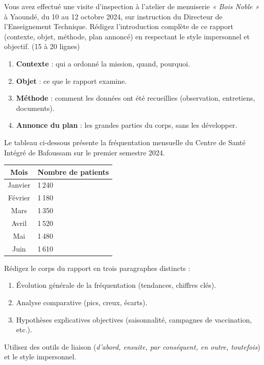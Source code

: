 \documentclass[11pt]{article}
\newcounter{popsec}
\newcounter{popsub}
\newcommand{\courssub}[1]{%
  \stepcounter{popsub}%
  \par\vspace{9pt}\noindent{\popxbold\fontsize{11.5}{13}\selectfont\color{popink}{\color{poporange}\thepopsec.\thepopsub}\hspace{6pt}#1}\par\nopagebreak\vspace{4pt}
}
\begin{document}
\courssub{Je m'entraîne}

\begin{exercice}
Vous avez effectué une visite d'inspection à l'atelier de menuiserie \emph{« Bois Noble »} à Yaoundé, du 10 au 12 octobre 2024, sur instruction du Directeur de l'Enseignement Technique. Rédigez l'introduction complète de ce rapport (contexte, objet, méthode, plan annoncé) en respectant le style impersonnel et objectif. (15 à 20 lignes)
\end{exercice}

\begin{methode}
\begin{enumerate}
    \item \textbf{Contexte} : qui a ordonné la mission, quand, pourquoi.
    \item \textbf{Objet} : ce que le rapport examine.
    \item \textbf{Méthode} : comment les données ont été recueillies (observation, entretiens, documents).
    \item \textbf{Annonce du plan} : les grandes parties du corps, sans les développer.
\end{enumerate}
\end{methode}

\begin{exercice}
Le tableau ci-dessous présente la fréquentation mensuelle du Centre de Santé Intégré de Bafoussam sur le premier semestre 2024.

\begin{center}
\begin{tabularx}{\linewidth}{|c|X|}\hline
\rowcolor{popblueL}\textbf{Mois} & \textbf{Nombre de patients} \\ \hline
Janvier & 1\,240 \\ \hline
Février & 1\,180 \\ \hline
Mars & 1\,350 \\ \hline
Avril & 1\,520 \\ \hline
Mai & 1\,480 \\ \hline
Juin & 1\,610 \\ \hline
\end{tabularx}
\end{center}

Rédigez le corps du rapport en trois paragraphes distincts :
\begin{enumerate}
    \item Évolution générale de la fréquentation (tendances, chiffres clés).
    \item Analyse comparative (pics, creux, écarts).
    \item Hypothèses explicatives objectives (saisonnalité, campagnes de vaccination, etc.).
\end{enumerate}
Utilisez des outils de liaison (\emph{d'abord, ensuite, par conséquent, en outre, toutefois}) et le style impersonnel.
\end{exercice}
\end{document}
